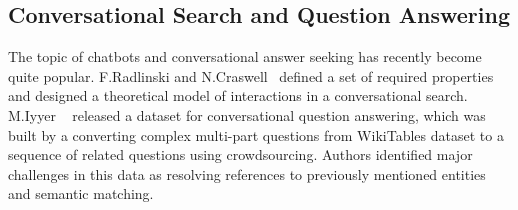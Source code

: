 

\subsection{Conversational Search and Question Answering}
\label{section:relatedwork:user:conversation}

The topic of chatbots and conversational answer seeking has recently become quite popular.
F.Radlinski and N.Craswell~\cite{radlinski2017} defined a set of required properties and designed a theoretical model of interactions in a conversational search.
M.Iyyer \etal~\cite{iyyer2016answering} released a dataset for conversational question answering, which was built by a converting complex multi-part questions from WikiTables dataset to a sequence of related questions using crowdsourcing.
Authors identified major challenges in this data as resolving references to previously mentioned entities and semantic matching.

